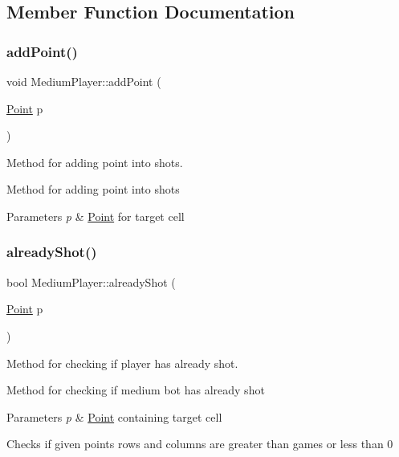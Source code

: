 \subsection{Member Function Documentation}
\mbox{\label{class_medium_player_a4cd5cbf0327e002112c80a52b279358f}} 
\subsubsection{\texorpdfstring{add\+Point()}{addPoint()}}
{\footnotesize\ttfamily void Medium\+Player\+::add\+Point (\begin{DoxyParamCaption}\item[{\mbox{\hyperlink{class_point}{Point}}}]{p }\end{DoxyParamCaption})\hspace{0.3cm}{\ttfamily [virtual]}}



Method for adding point into shots. 

Method for adding point into shots 
\begin{DoxyParams}{Parameters}
{\em p} & \mbox{\hyperlink{class_point}{Point}} for target cell \\
\hline
\end{DoxyParams}
\mbox{\label{class_medium_player_a0c237af510ff84898759ed2e9a9271ce}} 
\subsubsection{\texorpdfstring{already\+Shot()}{alreadyShot()}}
{\footnotesize\ttfamily bool Medium\+Player\+::already\+Shot (\begin{DoxyParamCaption}\item[{\mbox{\hyperlink{class_point}{Point}}}]{p }\end{DoxyParamCaption})\hspace{0.3cm}{\ttfamily [virtual]}}



Method for checking if player has already shot. 

Method for checking if medium bot has already shot 
\begin{DoxyParams}{Parameters}
{\em p} & \mbox{\hyperlink{class_point}{Point}} containing target cell \\
\hline
\end{DoxyParams}
Checks if given point\textquotesingle{}s rows and columns are greater than game\textquotesingle{}s or less than 0

